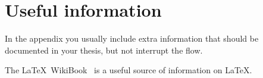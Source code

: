 \chapter{Useful information}
\label{sec:app}

In the appendix you usually include extra information that should be
documented in your thesis, but not interrupt the flow.

The \LaTeX\ WikiBook~\cite{latexwiki} is a useful source of information on \LaTeX.
